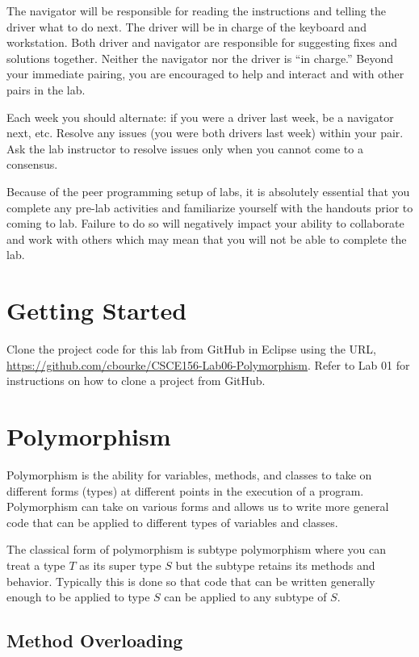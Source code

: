 \documentclass[12pt]{scrartcl}
\begin{document}
The navigator will be responsible for reading the instructions and
telling the driver what to do next.  The driver will be in charge of the
keyboard and workstation.  Both driver and navigator are responsible
for suggesting fixes and solutions together.  Neither the navigator
nor the driver is ``in charge.''  Beyond your immediate pairing, you
are encouraged to help and interact and with other pairs in the lab.

Each week you should alternate: if you were a driver last week, 
be a navigator next, etc.  Resolve any issues (you were both drivers
last week) within your pair.  Ask the lab instructor to resolve issues
only when you cannot come to a consensus.  

Because of the peer programming setup of labs, it is absolutely 
essential that you complete any pre-lab activities and familiarize
yourself with the handouts prior to coming to lab.  Failure to do
so will negatively impact your ability to collaborate and work with 
others which may mean that you will not be able to complete the
lab.  

\section*{Getting Started}

Clone the project code for this lab from GitHub in Eclipse using the
URL, \url{https://github.com/cbourke/CSCE156-Lab06-Polymorphism}.
Refer to Lab 01 for instructions on how to clone a project from GitHub.

\section*{Polymorphism}

Polymorphism is the ability for variables, methods, and classes to 
take on different forms (types) at different points in the execution 
of a program.  Polymorphism can take on various forms and allows us 
to write more general code that can be applied to different types 
of variables and classes.

The classical form of polymorphism is subtype polymorphism where you 
can treat a type $T$ as its super type $S$ but the subtype retains 
its methods and behavior.  Typically this is done so that code that 
can be written generally enough to be applied to type $S$ can be applied 
to any subtype of $S$. 

\subsection*{Method Overloading}
\end{document}
